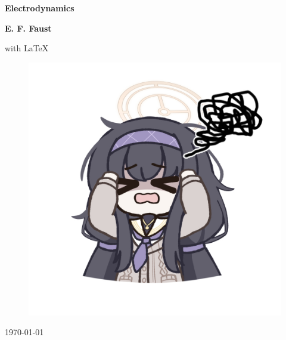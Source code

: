\documentclass[../main.tex]{subfiles}
\begin{document}
\begin{titlepage}
    \begin{center}
        \vspace*{1.5cm}
        
        \Huge
        \textbf{Electrodynamics}
    
        \vspace{0.5cm}
        \Large
        \textbf{E. F. Faust} 

        \vspace{0.2cm}
        \large with \LaTeX
        
        \vfill
        \begin{figure}[h!]
            \centering
            \includegraphics[width=\textwidth]{../Cover/112130790_p0.jpg}
        \end{figure}
        \vfill
        \Large
        {\today}
        
    \end{center}
\end{titlepage}
\end{document}
